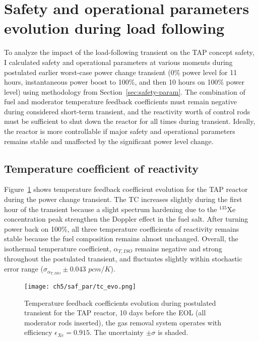 
\section{Safety and operational parameters evolution during load following}
To analyze the impact of the load-following transient on the \gls{TAP} concept 
safety, I calculated safety and operational parameters at various moments 
during postulated earlier worst-case power change transient (0\% power level 
for 11 hours, instantaneous power boost to 100\%, and then 10 hours on 100\% 
power level) using methodology from Section~\ref{sec:safety-param}. The 
combination of fuel and moderator temperature feedback coefficients must 
remain negative during considered short-term transient, and the reactivity 
worth of control rods must be sufficient to shut down the reactor for all 
times during transient. Ideally, the reactor is more controllable if major 
safety and operational parameters remains stable and unaffected by the 
significant power level change.

\subsection{Temperature coefficient of reactivity}
Figure~\ref{fig:lf-tap-tc-evo} shows temperature feedback coefficient 
evolution for the \gls{TAP} reactor during the power change transient. The TC 
increases slightly during the first hour of the transient because a slight 
spectrum hardening due to the $^{135}$Xe concentration peak strengthen the 
Doppler effect in the fuel salt. After turning power back on 100\%, all three 
temperature coefficients of reactivity remains stable because the fuel 
composition remains almost unchanged. Overall, the isothermal temperature 
coefficient, $\alpha_{T,ISO}$ remains negative and strong throughout the 
postulated transient, and fluctuates slightly within stochastic error range 
($\sigma_{\alpha_{T,ISO}}\pm0.043$ $pcm/K$). 
\begin{figure}[htp!] %
	\centering
	\texttt{[image: ch5/saf\_par/tc\_evo.png]}
	\caption{Temperature feedback coefficients evolution during postulated 
		transient for the \gls{TAP} reactor, 10 days before the \gls{EOL} (all 
		moderator rods inserted), the gas removal system operates with 
		efficiency $\epsilon_{Xe}=0.915$. The uncertainty $\pm\sigma$ is 
		shaded.}
		\label{fig:lf-tap-tc-evo}
\end{figure}

